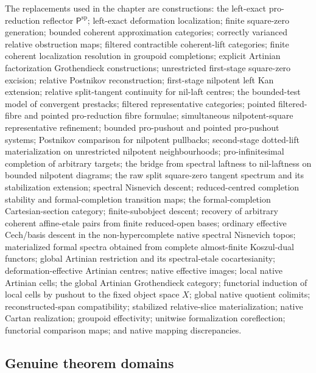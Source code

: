 The replacements used in the chapter are constructions: the left-exact
pro-reduction reflector $\mathsf P^{\mathrm{sp}}$; left-exact deformation
localization; finite square-zero generation; bounded coherent approximation
categories; correctly varianced relative obstruction maps; filtered
contractible coherent-lift categories; finite coherent localization resolution in groupoid
completions; explicit Artinian factorization Grothendieck constructions;
unrestricted first-stage square-zero excision; relative Postnikov
reconstruction; first-stage nilpotent left Kan extension; relative
split-tangent continuity for nil-laft centres; the bounded-test model of
convergent prestacks; filtered representative categories; pointed
filtered-fibre and pointed pro-reduction fibre formulae; simultaneous
nilpotent-square representative refinement; bounded pro-pushout and pointed
pro-pushout systems; Postnikov comparison for nilpotent pullbacks;
second-stage dotted-lift
materialization on unrestricted nilpotent neighbourhoods; pro-infinitesimal
completion of arbitrary targets; the bridge from spectral laftness to
nil-laftness on bounded nilpotent diagrams; the raw split square-zero tangent
spectrum and its stabilization extension; spectral Nisnevich descent;
reduced-centred completion stability and formal-completion transition maps;
the formal-completion Cartesian-section category; finite-subobject descent;
recovery of arbitrary coherent affine-etale pairs from finite reduced-open
bases; ordinary effective Cech/basis descent in the non-hypercomplete native
spectral Nisnevich topos; materialized formal spectra obtained from complete
almost-finite Koszul-dual functors; global Artinian restriction and its spectral-etale
cocartesianity; deformation-effective Artinian centres; native effective images;
local native Artinian cells; the global Artinian Grothendieck category;
functorial induction of local cells by pushout to the fixed object space $X$;
global native quotient colimits; reconstructed-span compatibility; stabilized
relative-slice materialization; native Cartan realization; groupoid
effectivity; unitwise formalization coreflection; functorial comparison maps;
and native mapping discrepancies.

\subsection{Genuine theorem domains}

